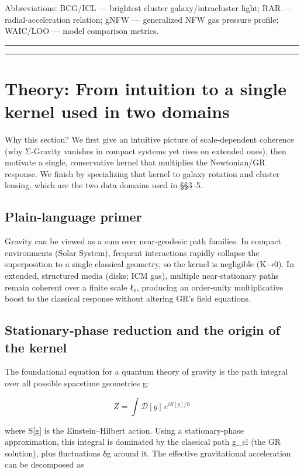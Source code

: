 \documentclass[11pt,a4paper]{article}
\begin{document}
Abbreviations: BCG/ICL — brightest cluster galaxy/intracluster light; RAR — radial‑acceleration relation; gNFW — generalized NFW gas pressure profile; WAIC/LOO — model comparison metrics.


\medskip\hrule\medskip

\medskip\hrule\medskip


\section{Theory: From intuition to a single kernel used in two domains}


Why this section? We first give an intuitive picture of scale‑dependent coherence (why Σ‑Gravity vanishes in compact systems yet rises on extended ones), then motivate a single, conservative kernel that multiplies the Newtonian/GR response. We finish by specializing that kernel to galaxy rotation and cluster lensing, which are the two data domains used in §§3–5.


\subsection{Plain‑language primer}


Gravity can be viewed as a sum over near‑geodesic path families. In compact environments (Solar System), frequent interactions rapidly collapse the superposition to a single classical geometry, so the kernel is negligible (K→0). In extended, structured media (disks; ICM gas), multiple near‑stationary paths remain coherent over a finite scale ℓ₀, producing an order‑unity multiplicative boost to the classical response without altering GR’s field equations.


\subsection{Stationary‑phase reduction and the origin of the kernel}


The foundational equation for a quantum theory of gravity is the path integral over all possible spacetime geometries g:


\begin{equation}
Z = \int \mathcal{D}[g] \, e^{iS[g]/\hbar}
\end{equation}


where S[g] is the Einstein–Hilbert action. Using a stationary‑phase approximation, this integral is dominated by the classical path g\_cl (the GR solution), plus fluctuations δg around it. The effective gravitational acceleration can be decomposed as
\end{document}
